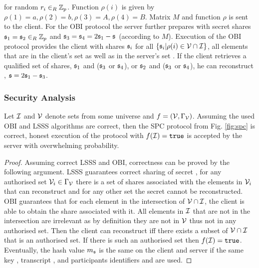 for random $r_i\in_R\mathbb{Z}_p$.
Function $\rho(i)$ is given by $\rho(1)=a,\rho(2)=b,\rho(3)=A,\rho(4)=B$.
Matrix $M$ and function $\rho$ is sent to the client.
For the \ac{OBI} protocol the server further prepares \ServerSet with secret shares $\mathfrak{s}_1=\mathfrak{s}_2\in_R\mathbb{Z}_p$ and $\mathfrak{s}_3=\mathfrak{s}_4=2\mathfrak{s}_1-\mathfrak{s}$ (according to $M$).
Execution of the \ac{OBI} protocol provides the client with shares $\mathfrak{s}_i$ for all $\{\mathfrak{s}_i|\rho(i)\in \mathcal{V}\cap \mathcal{I}\}$, \ie all elements that are in the client's set \ClientSet as well as in the server's set \ServerSet.
If the client retrieves a qualified set of shares, \ie $\mathfrak{s}_1$ and ($\mathfrak{s}_3$ or $\mathfrak{s}_4$), or $\mathfrak{s}_2$ and ($\mathfrak{s}_3$ or $\mathfrak{s}_4$), he can reconstruct \secret, \eg $\mathfrak{s}=2\mathfrak{s}_1-\mathfrak{s}_3$.

\subsubsection{Security Analysis}
\begin{lemma}[Correctness]\label{lem:correct}
  Let $\mathcal{I}$ and $\mathcal{V}$ denote sets from some universe and $f=(\mathcal{V},\Gamma_\mathcal{V})$.
  Assuming the used \ac{OBI} and \ac{LSSS} algorithms are correct, then the \ac{SPC} protocol from Fig. \ref{fig:spc} is correct, \ie honest execution of the protocol with $f(\mathcal{I}) = \mathtt{true}$ is accepted by the server with overwhelming probability.\end{lemma}
\begin{proof}
Assuming correct \ac{LSSS} and \ac{OBI}, correctness can be proved by the following argument.
LSSS guarantees correct sharing of secret \secret, \ie for any authorised set $\mathcal{V}_i\in \Gamma_\mathcal{V}$ there is a set of shares associated with the elements in $\mathcal{V}_i$ that can reconstruct \secret and for any other set the secret cannot be reconstructed. 
OBI guarantees that for each element in the intersection of $\mathcal{V}\cap \mathcal{I}$, the client is able to obtain the share associated with it. 
All elements in $\mathcal{I}$ that are not in the intersection are irrelevant as by definition they are not in $\mathcal{V}$ thus not in any authorised set. 
Then the client can reconstruct \secret iff there exists a subset of $\mathcal{V}\cap \mathcal{I}$ that is an authorised set. 
If there is such an authorised set then $f(\mathcal{I})=\mathtt{true}$. Eventually, the hash value $m_\mathfrak{s}$ is the same on the client and server if the same key \secret, transcript \trans, and participants identifiers \Client and \Server are used.
\end{proof}


